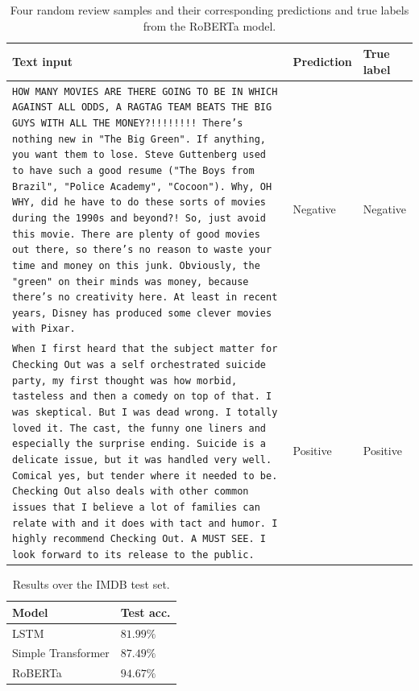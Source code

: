 \begin{table}[ht]
\caption{Four random review samples and their corresponding predictions and true labels from the RoBERTa model.}
\centering
\begin{tabularx}{\textwidth}{Xll}
Text input & Prediction & True label \\
\hline
 {\scriptsize \texttt{HOW MANY MOVIES ARE THERE GOING TO BE IN WHICH
AGAINST ALL ODDS, A RAGTAG TEAM BEATS THE BIG GUYS
WITH ALL THE MONEY?!!!!!!!! There's nothing new in
"The Big Green". If anything, you want them to
lose. Steve Guttenberg used to have such a good
resume ("The Boys from Brazil", "Police Academy",
"Cocoon"). Why, OH WHY, did he have to do these
sorts of movies during the 1990s and beyond?! So,
just avoid this movie. There are plenty of good
movies out there, so there's no reason to waste
your time and money on this junk. Obviously, the
"green" on their minds was money, because there's
no creativity here. At least in recent years,
Disney has produced some clever movies with Pixar.} } &   Negative & Negative   \\
\hline
 {\scriptsize \texttt{When I first heard that the subject matter for
Checking Out was a self orchestrated suicide
party, my first thought was how morbid, tasteless
and then a comedy on top of that. I was skeptical.
But I was dead wrong. I totally loved it. The
cast, the funny one liners and especially the
surprise ending. Suicide is a delicate issue, but
it was handled very well. Comical yes, but tender
where it needed to be. Checking Out also deals
with other common issues that I believe a lot of
families can relate with and it does with tact and
humor. I highly recommend Checking Out. A MUST
SEE. I look forward to its release to the public.} } &   Positive & Positive   \\

\end{tabularx}
\label{tab:examples}
\end{table}

\begin{table}[h]
\caption{Results over the IMDB test set.}
\centering
\begin{tabular}{ll}
Model & Test acc. \\
\hline
LSTM &  $81.99\%$ \\
Simple Transformer &  $87.49\%$ \\
RoBERTa &  $94.67\%$\\
\end{tabular}
\label{tab:nlp}
\end{table}











